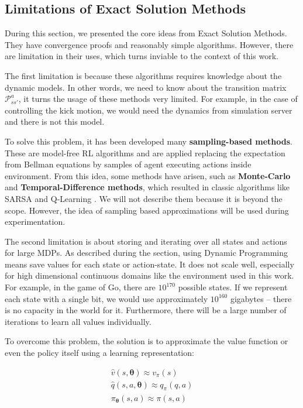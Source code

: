 \subsection{Limitations of Exact Solution Methods}

During this section, we presented the core ideas from Exact Solution Methods. They have convergence proofs and reasonably simple algorithms. However, there are limitation in their uses, which turns inviable to the context of this work.

The first limitation is because these algorithms requires knowledge about the dynamic models. In other words, we need to know about the transition matrix $\mathcal{P}_{ss'}^a$, it turns the usage of these methods very limited. For example, in the case of controlling the kick motion, we would need the dynamics from simulation server and there is not this model.

To solve this problem, it has been developed many \textbf{sampling-based methods}. These are model-free RL algorithms and are applied replacing the expectation from Bellman equations by samples of agent executing actions inside environment. From this idea, some methods have arisen, such as \textbf{Monte-Carlo} and \textbf{Temporal-Difference methods}, which resulted in classic algorithms like SARSA \cite{Rummery94on-lineq-learning} and Q-Learning \cite{Watkins:1989}. We will not describe them because it is beyond the scope. However, the idea of sampling based approximations will be used during experimentation.

The second limitation is about storing and iterating over all states and actions for large MDPs. As described during the section, using Dynamic Programming means save values for each state or action-state. It does not scale well, especially for high dimensional continuous domains like the environment used in this work. For example, in the game of Go, there are $10^{170}$ possible states. If we represent each state with a single bit, we would use approximately $10^{160}$ gigabytes -- there is no capacity in the world for it. Furthermore, there will be a large number of iterations to learn all values individually.

To overcome this problem, the solution is to approximate the value function or even the policy itself using a learning representation:

\begin{align}
\hat v (s, \boldsymbol{\theta} ) \approx v_\pi(s) \\
\hat q (s, a, \boldsymbol{\theta}) \approx q_\pi(q,a) \\
\pi_{\boldsymbol{\theta}}(s,a) \approx \pi(s,a)
\end{align}


